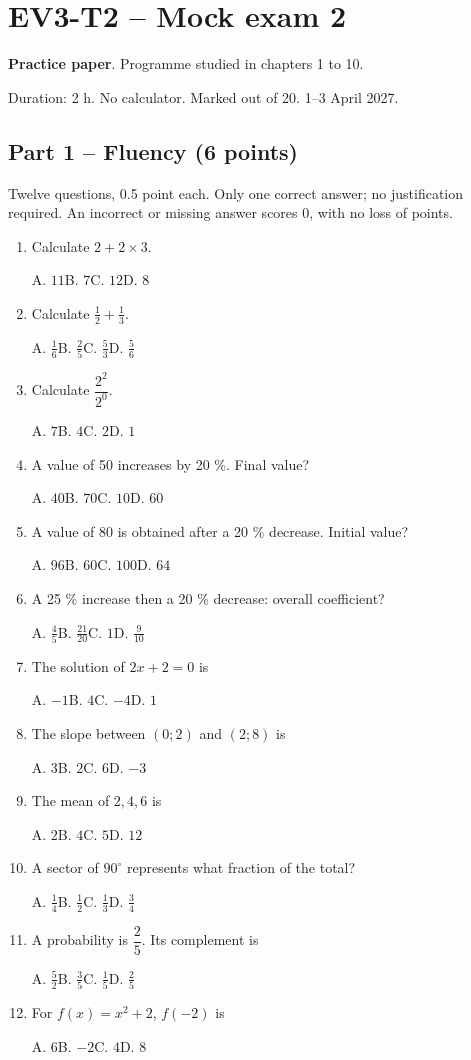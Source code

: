 \clearpage\section*{EV3-T2 -- Mock exam 2}\label{EV3-T2}
\textbf{Practice paper}. Programme studied in chapters 1 to 10.\par Duration: 2 h. No calculator. Marked out of 20. 1--3 April 2027.
\subsection*{Part 1 -- Fluency (6 points)}
Twelve questions, 0.5 point each. Only one correct answer; no justification required. An incorrect or missing answer scores 0, with no loss of points.
\begin{enumerate}
\item Calculate $2+2\times3$.\par A. $11$\quad B. $7$\quad C. $12$\quad D. $8$
\item Calculate $\frac12+\frac13$.\par A. $\frac{1}{6}$\quad B. $\frac{2}{5}$\quad C. $\frac{5}{3}$\quad D. $\frac{5}{6}$
\item Calculate $\dfrac{2^2}{2^{0}}$.\par A. $7$\quad B. $4$\quad C. $2$\quad D. $1$
\item A value of 50 increases by 20 \%. Final value?\par A. $40$\quad B. $70$\quad C. $10$\quad D. $60$
\item A value of 80 is obtained after a 20 \% decrease. Initial value?\par A. $96$\quad B. $60$\quad C. $100$\quad D. $64$
\item A 25 \% increase then a 20 \% decrease: overall coefficient?\par A. $\frac{4}{5}$\quad B. $\frac{21}{20}$\quad C. $1$\quad D. $\frac{9}{10}$
\item The solution of $2x+2=0$ is\par A. $-1$\quad B. $4$\quad C. $-4$\quad D. $1$
\item The slope between $(0;2)$ and $(2;8)$ is\par A. $3$\quad B. $2$\quad C. $6$\quad D. $-3$
\item The mean of $2, 4, 6$ is\par A. $2$\quad B. $4$\quad C. $5$\quad D. $12$
\item A sector of $90^\circ$ represents what fraction of the total?\par A. $\frac{1}{4}$\quad B. $\frac{1}{2}$\quad C. $\frac{1}{3}$\quad D. $\frac{3}{4}$
\item A probability is $\dfrac{2}{5}$. Its complement is\par A. $\frac{5}{2}$\quad B. $\frac{3}{5}$\quad C. $\frac{1}{5}$\quad D. $\frac{2}{5}$
\item For $f(x)=x^2+2$, $f(-2)$ is\par A. $6$\quad B. $-2$\quad C. $4$\quad D. $8$
\end{enumerate}
